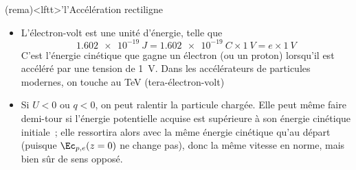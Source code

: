 \documentclass[../../main/main.tex]{subfiles}
\begin{document}
\begin{tcb*}(rema)<lftt>'l'{Accélération rectiligne}
	\begin{itemize}
		\item L'électron-volt est une unité d'énergie, telle que
		      \[\SI{1.602e-19}{J} = \SI{1.602e-19}{C}\times\SI{1}{V} =
			      e\times\SI{1}{V}\]
		      C'est l'énergie cinétique que gagne un électron (ou un proton)
		      lorsqu'il est accéléré par une tension de \SI{1}{V}. Dans les
		      accélérateurs de particules modernes, on touche au \si{TeV}
		      (tera-électron-volt)
		\item Si $U<0$ ou $q<0$, on peut ralentir la particule chargée. Elle
		      peut même faire demi-tour si l'énergie potentielle acquise est
		      supérieure à son énergie cinétique initiale~; elle ressortira alors
		      avec la même énergie cinétique qu'au départ (puisque
		      $\Ec_{p,e}(z=0)$ ne change pas), donc la même vitesse en norme, mais
		      bien sûr de sens opposé.
	\end{itemize}
\end{tcb*}
\end{document}
